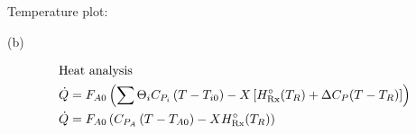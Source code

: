 Temperature plot:

\begin{center}
    
\end{center}

(b)

\begin{align*}
    \intertext{Heat analysis}
    \dot Q &= F_{A0} \left(\sum\Theta_iC_{P_i}\left(T - T_{i0}\right) - X \left[H_{\text{Rx}}^\circ(T_R) + \Delta C_P (T - T_R)\right]\right) \\
    \dot Q &= F_{A0} \left(C_{P_A}\left(T - T_{A0}\right) - X H_{\text{Rx}}^\circ(T_R)\right) \\
\end{align*}